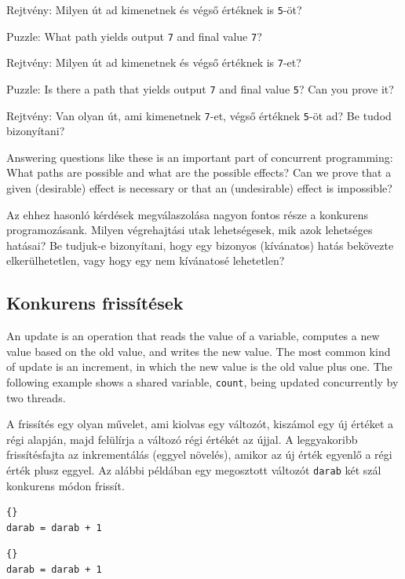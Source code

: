 \documentclass{book}
\begin{document}
Rejtvény: Milyen út ad kimenetnek és végső értéknek
is {\tt 5}-öt?

Puzzle: What path yields output {\tt 7} and final
value {\tt 7}?

Rejtvény: Milyen út ad kimenetnek és végső értéknek
is {\tt 7}-et?

Puzzle: Is there a path that yields output {\tt 7} and final
value {\tt 5}?  Can you prove it?

Rejtvény: Van olyan út, ami kimenetnek {\tt 7}-et, végső értéknek
{\tt 5}-öt ad? Be tudod bizonyítani?

Answering questions like these is an important part of concurrent
programming:  What paths are possible and what are the
possible effects?  Can we prove that a given (desirable) effect is
necessary or that an (undesirable) effect is impossible?

Az ehhez hasonló kérdések megválaszolása nagyon fontos része
a konkurens programozásank. Milyen végrehajtási utak lehetségesek,
mik azok lehetséges hatásai? Be tudjuk-e bizonyítani, hogy egy
bizonyos (kívánatos) hatás bekövezte elkerülhetetlen, vagy
hogy egy nem kívánatosé lehetetlen?

\subsection{Konkurens frissítések}

An update is an operation that reads the value of a variable, computes
a new value based on the old value, and writes the new value.
The most common kind of update is an increment, in which the
new value is the old value plus one.  The following example
shows a shared variable, {\tt count}, being updated concurrently
by two threads.

A frissítés egy olyan művelet, ami kiolvas egy változót, kiszámol
egy új értéket a régi alapján, majd felülírja a változó régi értékét
az újjal. A leggyakoribb frissítésfajta az inkrementálás (eggyel növelés),
amikor az új érték egyenlő a régi érték plusz eggyel. Az alábbi példában egy
megosztott változót {\tt darab} két szál konkurens módon frissít.

\begin{minipage}[t]{2in}
\begin{lstlisting}[title={„A” szál}]{}
darab = darab + 1
\end{lstlisting}
\end{minipage}
\hfill
\begin{minipage}[t]{2in}
\begin{lstlisting}[title={„B” szál}]{}
darab = darab + 1
\end{lstlisting}
\end{minipage}
\end{document}
